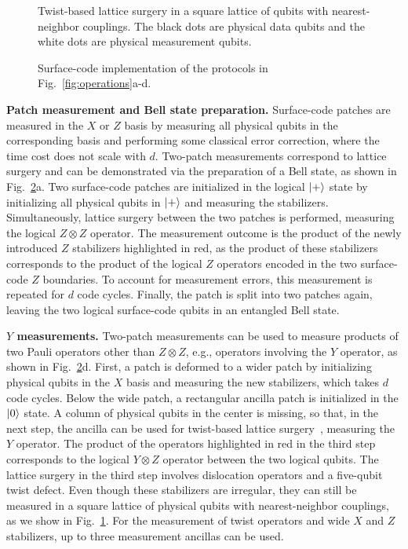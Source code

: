 \documentclass[prx,aps,letterpaper,twocolumn,allowfontchageintitle=true,accepted=2019-02-01]{quantumarticle}
\begin{document}
\begin{figure}[!t]
\centering
\def\svgwidth{\linewidth}

\caption{Twist-based lattice surgery in a square lattice of qubits with nearest-neighbor couplings. The black dots are physical data qubits and the white dots are physical measurement qubits.}
\label{fig:twist}
\end{figure}

\begin{figure}[!t]
\centering
\def\svgwidth{\linewidth}

\caption{Surface-code implementation of the protocols in Fig.~\ref{fig:operations}a-d.}
\label{fig:scop1}
\end{figure}



\textbf{Patch measurement and Bell state preparation.} Surface-code patches are measured in the $X$ or $Z$ basis by measuring all physical qubits in the corresponding basis and performing some classical error correction, where the time cost does not scale with $d$. Two-patch measurements correspond to lattice surgery and can be demonstrated via the preparation of a Bell state, as shown in Fig.~\ref{fig:scop1}a. Two surface-code patches are initialized in the logical $\ket{+}$ state by initializing all physical qubits in $\ket{+}$ and measuring the stabilizers.
Simultaneously, lattice surgery between the two patches is performed, measuring the logical $Z \otimes Z$ operator. The measurement outcome is the product of the newly introduced $Z$ stabilizers highlighted in red, as the product of these stabilizers corresponds to the product of the logical $Z$ operators encoded in the two surface-code $Z$ boundaries. To account for measurement errors, this measurement is repeated for $d$ code cycles. Finally, the patch is split into two patches again, leaving the two logical surface-code qubits in an entangled Bell state.


\textbf{$Y$ measurements.} Two-patch measurements can be used to measure products of two Pauli operators other than $Z\otimes Z$, e.g., operators involving the $Y$ operator, as shown in Fig.~\ref{fig:scop1}d. First, a patch is deformed to a wider patch by initializing physical qubits in the $X$ basis and measuring the new stabilizers, which takes $d$ code cycles. Below the wide patch, a rectangular ancilla patch is initialized in the $\ket{0}$ state. A column of physical qubits in the center is missing, so that, in the next step, the ancilla can be used for twist-based lattice surgery~\cite{Litinski2017b}, measuring the $Y$ operator. The product of the operators highlighted in red in the third step corresponds to the logical $Y \otimes Z$ operator between the two logical qubits. The lattice surgery in the third step involves dislocation operators and a five-qubit twist defect. Even though these stabilizers are irregular, they can still be measured in a square lattice of physical qubits with nearest-neighbor couplings, as we show in Fig.~\ref{fig:twist}. For the measurement of twist operators and wide $X$ and $Z$ stabilizers, up to three measurement ancillas can be used.
\end{document}
